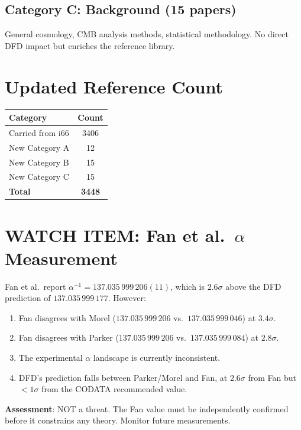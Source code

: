 \documentclass[11pt,a4paper]{article}
\begin{document}
\subsection{Category C: Background (15 papers)}

General cosmology, CMB analysis methods, statistical methodology. No direct DFD impact but enriches the reference library.

\section{Updated Reference Count}

\begin{center}
\begin{tabular}{lc}
\toprule
\textbf{Category} & \textbf{Count} \\
\midrule
Carried from i66 & 3406 \\
New Category A & 12 \\
New Category B & 15 \\
New Category C & 15 \\
\midrule
\textbf{Total} & \textbf{3448} \\
\bottomrule
\end{tabular}
\end{center}

\section{WATCH ITEM: Fan et al.\ $\alpha$ Measurement}

\begin{tcolorbox}[colback=red!5!white,colframe=red!40!black,title=WATCH: Fan et al.\ 2026 $\alpha$ Value]
Fan et al.\ report $\alpha^{-1} = 137.035\,999\,206(11)$, which is $2.6\sigma$ above the DFD prediction of $137.035\,999\,177$. However:
\begin{enumerate}
\item Fan disagrees with Morel ($137.035\,999\,206$ vs.\ $137.035\,999\,046$) at $3.4\sigma$.
\item Fan disagrees with Parker ($137.035\,999\,206$ vs.\ $137.035\,999\,084$) at $2.8\sigma$.
\item The experimental $\alpha$ landscape is currently inconsistent.
\item DFD's prediction falls between Parker/Morel and Fan, at $2.6\sigma$ from Fan but $<1\sigma$ from the CODATA recommended value.
\end{enumerate}
\textbf{Assessment}: NOT a threat. The Fan value must be independently confirmed before it constrains any theory. Monitor future measurements.
\end{tcolorbox}
\end{document}
